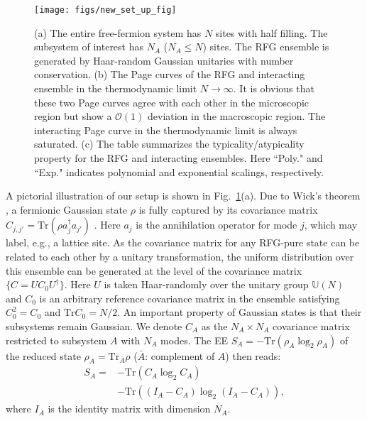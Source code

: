 \documentclass[twocolumn,english,prl,aps,superscriptaddress,amsmath,amssymb,floatfix]{revtex4-2}
\def \Tr {\mathrm{Tr}}
\begin{document}
\begin{figure}
\texttt{[image: figs/new\_set\_up\_fig]}\caption{(a) The entire 
free-fermion system has $N$ sites with half filling. The 
subsystem of interest 
has $N_{A}$ ($N_{A}\le N$) sites. 
The RFG ensemble is generated by Haar-random Gaussian unitaries with number conservation. 
(b) 
The Page curves of the RFG 
and interacting ensemble in the thermodynamic limit $N\to\infty$. 
It is obvious that these two Page curves agree with each other in the microscopic region but show a $\mathcal{O}(1)$ deviation in the macroscopic region. The interacting Page curve in the thermodynamic limit is always saturated. (c) The table summarizes the typicality/atypicality property for the RFG and interacting ensembles. Here ``Poly." and ``Exp." indicates polynomial and exponential scalings, respectively.}
\label{Setup_of_CCRFG_ensemble}
\end{figure}

A pictorial illustration of our setup is shown %
in Fig.~\ref{Setup_of_CCRFG_ensemble}(a). 
Due to Wick's theorem \citep{Hackl2021}, a fermionic Gaussian %
state $\rho$ is %
fully captured %
by its covariance matrix $C_{j,j'}=\mathrm{Tr}(\rho a_{j}^{\dagger}a_{j'})$ \cite{Peschel2003}.
Here $a_{j}$ is the annihilation operator for mode $j$, which may label, e.g., a lattice site. 
As the covariance matrix for any RFG-pure state can be related to each
other by a unitary transformation, 
the uniform distribution over this ensemble can be generated at the
level of the covariance matrix $\{C=UC_{0}U^{\dagger}\}$. Here 
$U$ is taken Haar-randomly over the unitary group $\mathbb{U}(N)$ 
\citep{Bianchi2021,Bianchi2021a} and
$C_{0}$ is an arbitrary reference 
covariance matrix in the ensemble satisfying $C_0^2=C_0$ and $\Tr C_0=N/2$.
An important property of Gaussian states is that their subsystems remain Gaussian. 
We denote $C_{A}$ as the $N_A\times N_A$ covariance matrix restricted
to subsystem $A$ with $N_A$ modes. The EE $S_A=-\Tr(\rho_A\log_2\rho_A)$ of the reduced state $\rho_A=\Tr_{\bar A}\rho$ ($\bar A$: complement of $A$) then reads:
\begin{equation}
\begin{split}
    S_{A}=&-\Tr(C_A\log_2 C_A)\\
    &-\Tr((I_A-C_A)\log_2 (I_A-C_A)), 
    \end{split}
    \label{eq:SA}
\end{equation}
where $I_A$ is the identity matrix with dimension $N_A$.
\end{document}
